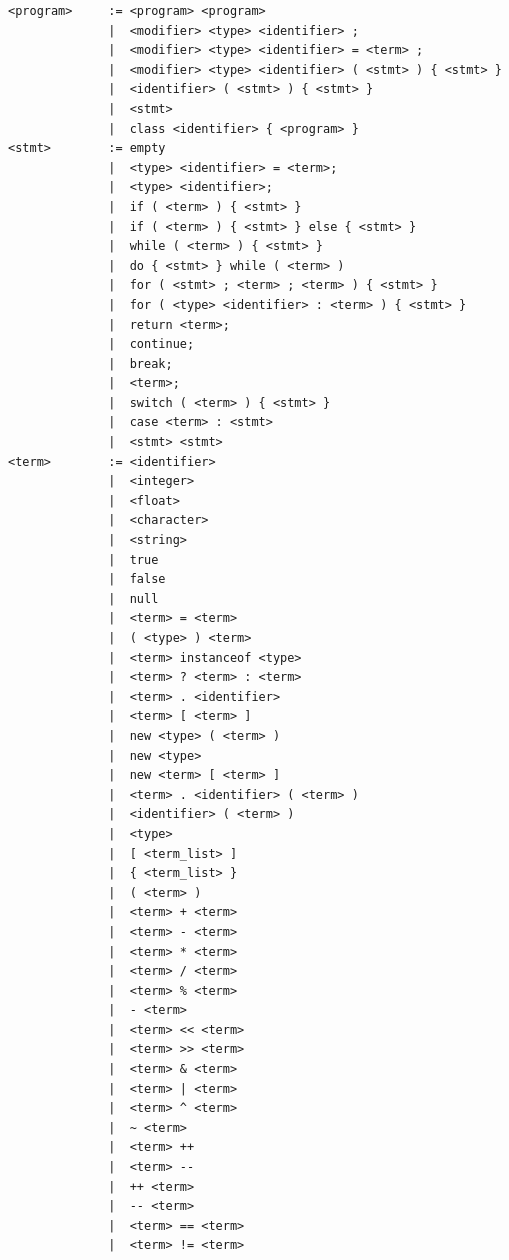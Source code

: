 \documentclass[manuscript,screen]{acmart}
\begin{document}
\begin{tcolorbox}[
    enhanced,
    breakable,
    colback=blue!5!white,
    colframe=blue!50!black,
    title=Java Subset Language Grammar,
    fonttitle=\bfseries,
    boxrule=1pt,
    arc=3pt
]
\begin{Verbatim}[fontsize=\small]
<program>     := <program> <program>
              |  <modifier> <type> <identifier> ;
              |  <modifier> <type> <identifier> = <term> ;
              |  <modifier> <type> <identifier> ( <stmt> ) { <stmt> }
              |  <identifier> ( <stmt> ) { <stmt> }
              |  <stmt>
              |  class <identifier> { <program> }
<stmt>        := empty
              |  <type> <identifier> = <term>;
              |  <type> <identifier>;
              |  if ( <term> ) { <stmt> }
              |  if ( <term> ) { <stmt> } else { <stmt> }
              |  while ( <term> ) { <stmt> }
              |  do { <stmt> } while ( <term> )
              |  for ( <stmt> ; <term> ; <term> ) { <stmt> }
              |  for ( <type> <identifier> : <term> ) { <stmt> }
              |  return <term>;
              |  continue;
              |  break;
              |  <term>;
              |  switch ( <term> ) { <stmt> }
              |  case <term> : <stmt>
              |  <stmt> <stmt>
<term>        := <identifier>
              |  <integer>
              |  <float>
              |  <character>
              |  <string>
              |  true
              |  false
              |  null
              |  <term> = <term>
              |  ( <type> ) <term>
              |  <term> instanceof <type>
              |  <term> ? <term> : <term>
              |  <term> . <identifier>
              |  <term> [ <term> ]
              |  new <type> ( <term> )
              |  new <type>
              |  new <term> [ <term> ]
              |  <term> . <identifier> ( <term> )
              |  <identifier> ( <term> )
              |  <type>
              |  [ <term_list> ]
              |  { <term_list> }
              |  ( <term> )
              |  <term> + <term>
              |  <term> - <term>
              |  <term> * <term>
              |  <term> / <term>
              |  <term> % <term>
              |  - <term>
              |  <term> << <term>
              |  <term> >> <term>
              |  <term> & <term>
              |  <term> | <term>
              |  <term> ^ <term>
              |  ~ <term>
              |  <term> ++
              |  <term> --
              |  ++ <term>
              |  -- <term>
              |  <term> == <term>
              |  <term> != <term>

\end{Verbatim}
\end{tcolorbox}
\end{document}
